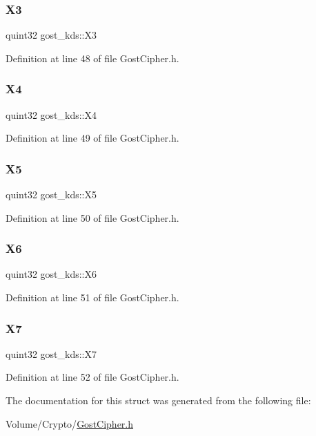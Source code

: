 \subsubsection{\texorpdfstring{X3}{X3}}
{\footnotesize\ttfamily quint32 gost\+\_\+kds\+::\+X3}



Definition at line 48 of file Gost\+Cipher.\+h.

\mbox{\label{structgost__kds_a81457c58875d16d72b44b53c2fd9e342}} 
\subsubsection{\texorpdfstring{X4}{X4}}
{\footnotesize\ttfamily quint32 gost\+\_\+kds\+::\+X4}



Definition at line 49 of file Gost\+Cipher.\+h.

\mbox{\label{structgost__kds_a04a9a487e04ac6567e734c68250dfd7a}} 
\subsubsection{\texorpdfstring{X5}{X5}}
{\footnotesize\ttfamily quint32 gost\+\_\+kds\+::\+X5}



Definition at line 50 of file Gost\+Cipher.\+h.

\mbox{\label{structgost__kds_a8b94f47ca33e4786266d3f9df1bb7c26}} 
\subsubsection{\texorpdfstring{X6}{X6}}
{\footnotesize\ttfamily quint32 gost\+\_\+kds\+::\+X6}



Definition at line 51 of file Gost\+Cipher.\+h.

\mbox{\label{structgost__kds_ac19573c51ead337871c20d2559be9e56}} 
\subsubsection{\texorpdfstring{X7}{X7}}
{\footnotesize\ttfamily quint32 gost\+\_\+kds\+::\+X7}



Definition at line 52 of file Gost\+Cipher.\+h.



The documentation for this struct was generated from the following file\+:\begin{DoxyCompactItemize}
\item 
Volume/\+Crypto/\hyperlink{_gost_cipher_8h}{Gost\+Cipher.\+h}\end{DoxyCompactItemize}
